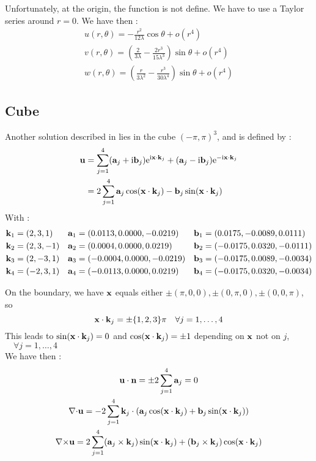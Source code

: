 Unfortunately, at the origin, the function is not define. We have to use a Taylor series around $r=0$. We have then :
\begin{gather*}
u(r,\theta) = -\frac{r^2}{12\lambda}\cos\theta +o(r^4)\\
v(r,\theta) = \left(\frac{2}{3\lambda}-\frac{2r^3}{15\lambda^3}\right)\sin\theta + o(r^4)\\
w(r,\theta) =
\left(\frac{r}{3\lambda^2}-\frac{r^3}{30\lambda^4}\right)\sin\theta + o(r^4)
\end{gather*} 

\subsection{Cube}
Another solution described in \cite{Penel2004} lies in the cube $(-\pi,\pi)^3$,
and is defined by :
\begin{align*}
{\mathbf{u}} &= \sum_{j=1}^4
({\mathbf{a}}_j+\mathrm{i}{\mathbf{b}}_j)\mathrm{e}^{\mathrm{i}{\mathbf{x}}\cdot{\mathbf{k}}_j} +
({\mathbf{a}}_j-\mathrm{i}{\mathbf{b}}_j)\mathrm{e}^{-\mathrm{i}{\mathbf{x}}\cdot{\mathbf{k}}_j}\\
&= 2\sum_{j=1}^4 {\mathbf{a}}_j\cos({\mathbf{x}}\cdot{\mathbf{k}}_j) - {\mathbf{b}}_j\sin({\mathbf{x}}\cdot{\mathbf{k}}_j)
\end{align*}
With :
\begin{align*}
{\mathbf{k}}_1 &= (2,3,1) & {\mathbf{a}}_1 &= (0.0113,0.0000,-0.0219) & {\mathbf{b}}_1 &=
(0.0175,-0.0089,0.0111)\\
{\mathbf{k}}_2 &= (2,3,-1) & {\mathbf{a}}_2 &= (0.0004,0.0000,0.0219) & {\mathbf{b}}_2 &=
(-0.0175,0.0320,-0.0111)\\
{\mathbf{k}}_3 &= (2,-3,1) & {\mathbf{a}}_3 &= (-0.0004,0.0000,-0.0219) & {\mathbf{b}}_3 &=
(-0.0175,0.0089,-0.0034)\\
{\mathbf{k}}_4 &= (-2,3,1) & {\mathbf{a}}_4 &= (-0.0113,0.0000,0.0219) & {\mathbf{b}}_4 &=
(-0.0175,0.0320,-0.0034)\\
\end{align*}

On the boundary, we have ${\mathbf{x}}$ equals either
$\pm(\pi,0,0),\pm(0,\pi,0),\pm(0,0,\pi)$, so
\[{\mathbf{x}}\cdot{\mathbf{k}}_j = \pm\{1,2,3\}\pi\quad \forall j=1,\dots,4\]
This leads to $\sin({\mathbf{x}}\cdot{\mathbf{k}}_j)=0$ and
$\cos({\mathbf{x}}\cdot{\mathbf{k}}_j)=\pm 1$ depending on ${\mathbf{x}}$ not on $j$, $\quad\forall j=1,\dots,4$\\
We have then :
\begin{gather}
{\mathbf{u}}\cdot{\mathbf{n}} = \pm 2 \sum_{j=1}^4 {\mathbf{a}}_j = 0\\
{\nabla\cdot}{\mathbf{u}} = -2\sum_{j=1}^4
{\mathbf{k}}_j\cdot({\mathbf{a}}_j\cos({\mathbf{x}}\cdot{\mathbf{k}}_j)+{\mathbf{b}}_j\sin({\mathbf{x}}\cdot{\mathbf{k}}_j))\\
{\nabla\times}{\mathbf{u}} = 2\sum_{j=1}^4({\mathbf{a}}_j\times{\mathbf{k}}_j)\sin({\mathbf{x}}\cdot{\mathbf{k}}_j) + ({\mathbf{b}}_j\times{\mathbf{k}}_j)\cos({\mathbf{x}}\cdot{\mathbf{k}}_j)
\end{gather}

